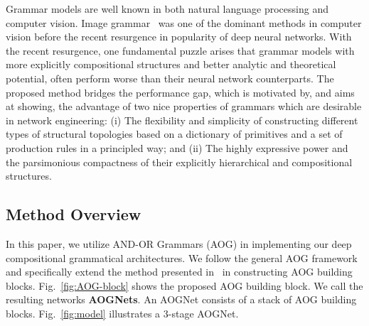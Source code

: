 \documentclass[10pt,twocolumn,letterpaper]{article}
\begin{document}
Grammar models are well known in both natural language processing and computer vision. Image grammar~\cite{Zhu_Grammar,Pff_Grammar,Yuille_AndOr,Geman_CompositionSystems} was one of the dominant methods in computer vision before the recent resurgence in popularity of deep neural networks. With the recent resurgence, one fundamental puzzle arises that grammar models with more explicitly compositional structures and better analytic and theoretical potential, often perform worse than their neural network counterparts. The proposed method bridges the performance gap, which is motivated by, and aims at showing, the advantage of two nice properties of grammars which are desirable in network engineering: (i) The flexibility and simplicity of constructing different types of structural topologies based on a dictionary of primitives and a set of production rules in a principled way; and (ii) The highly expressive power and the parsimonious  compactness of their explicitly hierarchical and compositional structures. %




\subsection{Method Overview}
In this paper, we utilize AND-OR Grammars (AOG) in implementing our deep compositional grammatical architectures. We follow the general AOG framework~\cite{Zhu_Grammar,Yuille_AndOr} and specifically extend the method presented in~\cite{DisAOT-CVPR,TLP-PAMI} in constructing AOG building blocks. Fig.~\ref{fig:AOG-block} shows the proposed AOG building block. We call the resulting networks \textbf{AOGNets}. An AOGNet consists of a stack of AOG building blocks. Fig.~\ref{fig:model} illustrates a 3-stage AOGNet. 
\end{document}

